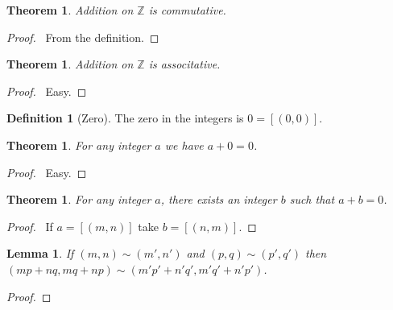 \documentclass{article}
\let\qed\relax
\newtheorem{lemma}[axiom]{Lemma}
\newtheorem{theorem}[axiom]{Theorem}
\theoremstyle{definition}
\newtheorem{definition}[axiom]{Definition}
\begin{document}
    \begin{theorem}
        Addition on $\mathbb{Z}$ is commutative.
    \end{theorem}

    \begin{proof}
        \pf\ From the definition. \qed
    \end{proof}

    \begin{theorem}
        Addition on $\mathbb{Z}$ is associtative.
    \end{theorem}

    \begin{proof}
        \pf\ Easy. \qed
    \end{proof}

    \begin{definition}[Zero]
        The zero in the integers is $0 = [(0,0)]$.
    \end{definition}

    \begin{theorem}
        For any integer $a$ we have $a + 0 = 0$.
    \end{theorem}

    \begin{proof}
        \pf\ Easy. \qed
    \end{proof}

    \begin{theorem}
        For any integer $a$, there exists an integer $b$ such that $a + b = 0$.
    \end{theorem}

    \begin{proof}
        \pf\ If $a = [(m,n)]$ take $b = [(n,m)]$. \qed
    \end{proof}

    \begin{lemma}
        If $(m,n) \sim (m',n')$ and $(p,q) \sim (p',q')$ then $(mp+nq,mq+np) \sim (m'p'+n'q',
        m'q'+n' p')$.
    \end{lemma}

    \begin{proof}
        \pf
        \qed
    \end{proof}
\end{document}
